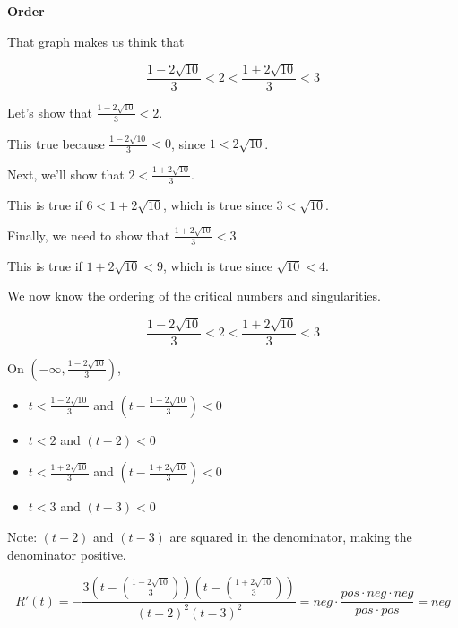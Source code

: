 \documentclass{ximera}
\begin{document}
\begin{explanation} \textbf{\textcolor{red!75!green}{Order}} 

That graph makes us think that 

\[
\frac{1 - 2 \sqrt{10}}{3} < 2 < \frac{1 + 2 \sqrt{10}}{3} < 3
\]


Let's show that $\frac{1 - 2 \sqrt{10}}{3} < 2$. 

This true because $\frac{1 - 2 \sqrt{10}}{3} < 0$, since $1 < 2 \sqrt{10}$. 



Next, we'll show that $2 < \frac{1 + 2 \sqrt{10}}{3}$. 



This is true if $6 < 1 + 2 \sqrt{10}$, which is true since $3 < \sqrt{10}$. 



Finally, we need to show that $\frac{1 + 2 \sqrt{10}}{3} < 3$ 


This is true if $1 + 2 \sqrt{10} < 9$, which is true since $\sqrt{10} < 4$.





\end{explanation}




We now know the ordering of the critical numbers and singularities. 


\[
\frac{1 - 2 \sqrt{10}}{3} < 2 < \frac{1 + 2 \sqrt{10}}{3} < 3
\]





On $\left( -\infty, \frac{1 - 2 \sqrt{10}}{3} \right)$, 



\begin{itemize}
\item $t < \frac{1 - 2 \sqrt{10}}{3}$ and $\left( t - \frac{1 - 2 \sqrt{10}}{3} \right) < 0$
\item $t < 2$ and $(t - 2) < 0$
\item $t < \frac{1 + 2 \sqrt{10}}{3}$ and $\left( t - \frac{1 + 2 \sqrt{10}}{3} \right) < 0$
\item $t < 3$ and $(t - 3) < 0$
\end{itemize}

Note: $(t-2)$ and $(t-3)$ are squared in the denominator, making the denominator positive. 

\[   
R'(t) = -\frac{3 \left(t - \left(\frac{1 - 2 \sqrt{10}}{3} \right) \right) \left(t - \left(\frac{1 + 2 \sqrt{10}}{3} \right) \right) }{ (t-2)^2 (t-3)^2 }  = neg \cdot \frac{pos \cdot neg \cdot neg}{pos \cdot pos} = neg
\]
\end{document}
